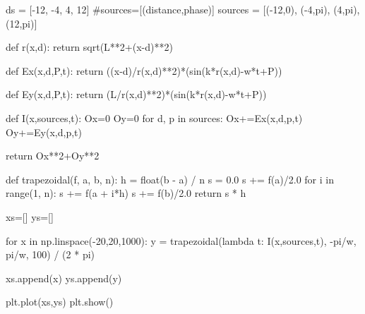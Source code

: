 ds = [-12, -4, 4, 12]
#sources=[(distance,phase)]
sources = [(-12,0), (-4,pi), (4,pi), (12,pi)]

def r(x,d):
    return sqrt(L**2+(x-d)**2)
    
def Ex(x,d,P,t):
    return ((x-d)/r(x,d)**2)*(sin(k*r(x,d)-w*t+P))
   
def Ey(x,d,P,t):
    return (L/r(x,d)**2)*(sin(k*r(x,d)-w*t+P))
 
def I(x,sources,t):
    Ox=0
    Oy=0
    for d, p in sources:
        Ox+=Ex(x,d,p,t)
        Oy+=Ey(x,d,p,t)
    
    return Ox**2+Oy**2
        
def trapezoidal(f, a, b, n):
    h = float(b - a) / n
    s = 0.0
    s += f(a)/2.0
    for i in range(1, n):
        s += f(a + i*h)
    s += f(b)/2.0
    return s * h

xs=[]
ys=[]

for x in np.linspace(-20,20,1000):
    y = trapezoidal(lambda t: I(x,sources,t), -pi/w, pi/w, 100) / (2 * pi)
   
    xs.append(x)
    ys.append(y)

plt.plot(xs,ys)
plt.show()
